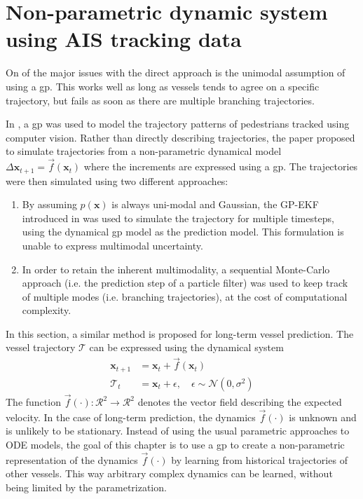 \chapter{Non-parametric dynamic system using AIS tracking data}
On of the major issues with the direct approach is the unimodal assumption of using a \acrshort{gp}. This works well as long as vessels tends to agree on a specific trajectory, but fails as soon as there are multiple branching trajectories.

In \cite{pedestrian}, a \acrshort{gp} was used to model the trajectory patterns of pedestrians tracked using computer vision. Rather than directly describing trajectories, the paper proposed to simulate trajectories from a non-parametric dynamical model $\Delta\boldsymbol{x}_{t+1} = \vec{f}(\boldsymbol{x}_t)$ where the increments are expressed using a \acrshort{gp}. The trajectories were then simulated using two different approaches:
\begin{enumerate}
    \item By assuming $p(\boldsymbol{x})$ is always uni-modal and Gaussian, the GP-EKF introduced in \cite{gpekf} was used to simulate the trajectory for multiple timesteps, using the dynamical \acrshort{gp} model as the prediction model. This formulation is unable to express multimodal uncertainty.
    \item In order to retain the inherent multimodality, a sequential Monte-Carlo approach (i.e. the prediction step of a particle filter) was used to keep track of multiple modes (i.e. branching trajectories), at the cost of computational complexity.
\end{enumerate}

In this section, a similar method is proposed for long-term vessel prediction. The vessel trajectory $\boldsymbol{\mathcal{T}}$ can be expressed using the dynamical system
\begin{subequations}
    \begin{align}
        \boldsymbol{x}_{t+1} & = \boldsymbol{x}_t + \vec{f}(\boldsymbol{x}_t)                              \\
        \mathcal{T}_t        & = \boldsymbol{x}_t + \epsilon, \quad \epsilon \sim \mathcal{N}(0, \sigma^2)
    \end{align}
\end{subequations}
The function $\vec{f}(\cdot): \mathcal{R}^2 \to \mathcal{R}^2$ denotes the vector field describing the expected velocity. In the case of long-term prediction, the dynamics $\vec{f}(\cdot)$ is unknown and is unlikely to be stationary. Instead of using the usual parametric approaches to ODE models, the goal of this chapter is to use a \acrshort{gp} to create a non-parametric representation of the dynamics $\vec{f}(\cdot)$ by learning from historical trajectories of other vessels. This way arbitrary complex dynamics can be learned, without being limited by the parametrization.


